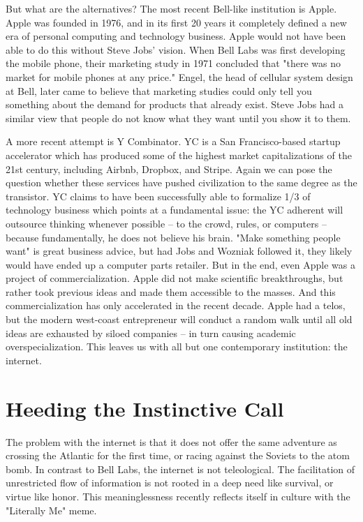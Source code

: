 \documentclass[12pt]{article}
\begin{document}
But what are the alternatives? The most recent Bell-like institution is Apple. Apple was founded in 1976, and in its first 20 years it completely defined a new era of personal computing and technology business. Apple would not have been able to do this without Steve Jobs' vision. When Bell Labs was first developing the mobile phone, their marketing study in 1971 concluded that "there was no market for mobile phones at any price." Engel, the head of cellular system design at Bell, later came to believe that marketing studies could only tell you something about the demand for products that already exist.\cite{ref2} Steve Jobs had a similar view that people do not know what they want until you show it to them.

A more recent attempt is Y Combinator. YC is a San Francisco-based startup accelerator which has produced some of the highest market capitalizations of the 21st century, including Airbnb, Dropbox, and Stripe. Again we can pose the question whether these services have pushed civilization to the same degree as the transistor. YC claims to have been successfully able to formalize 1/3 of technology business which points at a fundamental issue: the YC adherent will outsource thinking whenever possible – to the crowd, rules, or computers – because fundamentally, he does not believe his brain. "Make something people want" is great business advice, but had Jobs and Wozniak followed it, they likely would have ended up a computer parts retailer. But in the end, even Apple was a project of commercialization. Apple did not make scientific breakthroughs, but rather took previous ideas and made them accessible to the masses. And this commercialization has only accelerated in the recent decade. Apple had a telos, but the modern west-coast entrepreneur will conduct a random walk until all old ideas are exhausted by siloed companies – in turn causing academic overspecialization. This leaves us with all but one contemporary institution: the internet.

\newpage

\section*{Heeding the Instinctive Call}

The problem with the internet is that it does not offer the same adventure as crossing the Atlantic for the first time, or racing against the Soviets to the atom bomb. In contrast to Bell Labs, the internet is not teleological. The facilitation of unrestricted flow of information is not rooted in a deep need like survival, or virtue like honor. This meaninglessness recently reflects itself in culture with the "Literally Me" meme.
\end{document}
